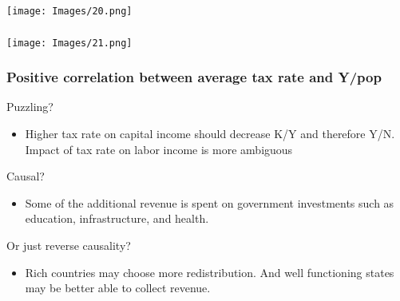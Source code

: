 \documentclass[serif,professionalfont,red,aspectratio=169]{beamer}
\begin{document}
\begin{frame}[t]
\frametitle{}
\begin{center}
\texttt{[image: Images/20.png]}
\end{center}
\end{frame}
\begin{frame}[t]
\frametitle{}
\begin{center}
\texttt{[image: Images/21.png]}
\end{center}
\end{frame}
\begin{frame}[t]
\frametitle{Positive correlation between average tax rate and Y/pop}
\textcolor{greens}{Puzzling?
}

\vspace{2mm}
\begin{itemize}
\item[~] Higher tax rate on capital income should decrease K/Y and therefore Y/N.  Impact of tax rate on labor income is 
	more ambiguous
\end{itemize}

\vspace{4mm}
\textcolor{greens}{Causal?
}
\vspace{2mm}
\begin{itemize}
\item[~] Some of the additional revenue is spent on government 	investments such as education, infrastructure, and health.
\end{itemize}
\vspace{4mm}

\textcolor{greens}{Or just reverse causality?
}
\vspace{2mm}
\begin{itemize}
\item[~] Rich countries may choose more redistribution.  And well functioning states may be better able to collect revenue.
\end{itemize}
\end{frame}
\end{document}
